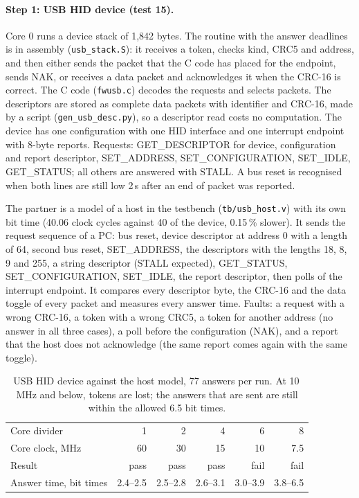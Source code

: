 \documentclass[10pt,a4paper]{article}
\begin{document}
\paragraph{Step 1: USB HID device (test 15).} Core 0 runs a device stack of 1,842 bytes. The routine with the
answer deadlines is in assembly (\texttt{usb\_stack.S}): it receives a token, checks kind, CRC5 and address,
and then either sends the packet that the C code has placed for the endpoint, sends NAK, or receives a data
packet and acknowledges it when the CRC-16 is correct. The C code (\texttt{fwusb.c}) decodes the requests and
selects packets. The descriptors are stored as complete data packets with identifier and CRC-16, made by a
script (\texttt{gen\_usb\_desc.py}), so a descriptor read costs no computation. The device has one configuration
with one HID interface and one interrupt endpoint with 8-byte reports. Requests: GET\_DESCRIPTOR for device,
configuration and report descriptor, SET\_ADDRESS, SET\_CONFIGURATION, SET\_IDLE, GET\_STATUS; all others are
answered with STALL. A bus reset is recognised when both lines are still low 2\,\textmu s after an end of packet
was reported.

The partner is a model of a host in the testbench (\texttt{tb/usb\_host.v}) with its own bit time
(40.06 clock cycles against 40 of the device, 0.15\,\% slower). It sends the request sequence of a PC: bus reset, device descriptor
at address 0 with a length of 64, second bus reset, SET\_ADDRESS, the descriptors with the lengths 18, 8, 9 and
255, a string descriptor (STALL expected), GET\_STATUS, SET\_CONFIGURATION, SET\_IDLE, the report descriptor,
then polls of the interrupt endpoint. It compares every descriptor byte, the CRC-16 and the data toggle of every
packet and measures every answer time. Faults: a request with a wrong CRC-16, a token with a wrong CRC5, a
token for another address (no answer in all three cases), a poll before the configuration (NAK), and a report
that the host does not acknowledge (the same report comes again with the same toggle).

\begin{table}[H]
\centering\small
\begin{tabularx}{\linewidth}{@{}Lrrrrr@{}}
\toprule
Core divider & 1 & 2 & 4 & 6 & 8 \\
Core clock, MHz & 60 & 30 & 15 & 10 & 7.5 \\
\midrule
Result & pass & pass & pass & fail & fail \\
Answer time, bit times & 2.4--2.5 & 2.5--2.8 & 2.6--3.1 & 3.0--3.9 & 3.8--6.5 \\
\bottomrule
\end{tabularx}
\caption{USB HID device against the host model, 77 answers per run. At 10\,MHz and below, tokens are lost;
the answers that are sent are still within the allowed 6.5 bit times.}
\end{table}
\end{document}
